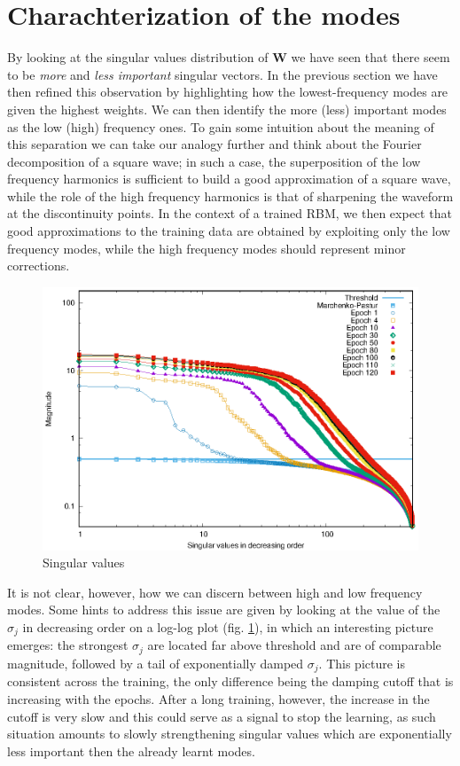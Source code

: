 \documentclass{revtex4-1}
\begin{document}
\section{Charachterization of the modes}
By looking at the singular values distribution of \(\mathbf{W}\) we have seen that there seem to be \textit{more} and \textit{less important} singular vectors. In the previous section we have then refined this observation by highlighting how the lowest-frequency modes are given the highest weights. We can then identify the more (less) important modes as the low (high) frequency ones. To gain some intuition about the meaning of this separation we can take our analogy further and think about the Fourier decomposition of a square wave; in such a case, the superposition of the low frequency harmonics is sufficient to build a good approximation of a square wave, while the role of the high frequency harmonics is that of sharpening the waveform at the discontinuity points. In the context of a trained RBM, we then expect that good approximations to the training data are obtained by exploiting only the low frequency modes, while the high frequency modes should represent minor corrections.

\begin{figure}
  \includegraphics{SV_pl.eps}
  \caption{Singular values}
  \label{fig:sv_pl}
\end{figure}

It is not clear, however, how we can discern between high and low frequency modes. Some hints to address this issue are given by looking at the value of the \(\sigma_j\) in decreasing order on a log-log plot (fig. \ref{fig:sv_pl}), in which an interesting picture emerges: the strongest \(\sigma_j\) are located far above threshold and are of comparable magnitude, followed by a tail of exponentially damped \(\sigma_j\). This picture is consistent across the training, the only difference being the damping cutoff that is increasing with the epochs. After a long training, however, the increase in the cutoff is very slow and this could serve as a signal to stop the learning, as such situation amounts to slowly strengthening singular values which are exponentially less important then the already learnt modes.
\end{document}
